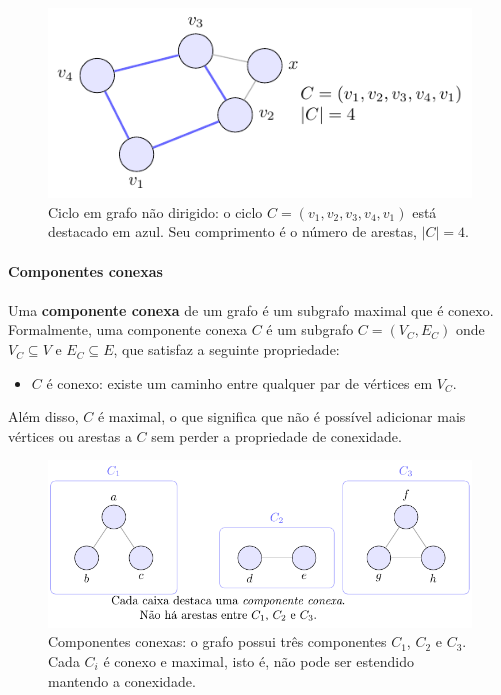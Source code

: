 \documentclass[12pt,a4paper]{article}
\def\emph#1{#1}%
\begin{document}
\begin{figure}[H]
    \centering
    \includegraphics[width=0.9\linewidth]{figures/fig_ciclo.pdf}

    \caption{Ciclo em grafo não dirigido: o ciclo $C=(v_1,v_2,v_3,v_4,v_1)$ está destacado em azul. Seu comprimento é o número de arestas, $|C|=4$.}
    \label{fig:ciclo}\end{figure}


\paragraph{Componentes conexas}
\paragraph{}Uma \textbf{componente conexa} de um grafo é um subgrafo maximal que é conexo. Formalmente, uma componente conexa \(C\) é um subgrafo \(C = (V_C, E_C)\) onde \(V_C \subseteq V\) e \(E_C \subseteq E\), que satisfaz a seguinte propriedade:
\begin{itemize}
    \item \(C\) é conexo: existe um caminho entre qualquer par de vértices em \(V_C\).
\end{itemize}
Além disso, \(C\) é maximal, o que significa que não é possível adicionar mais vértices ou arestas a \(C\) sem perder a propriedade de conexidade.


\begin{figure}[H]
    \centering
    \includegraphics[width=0.9\linewidth]{figures/fig_componentes.pdf}

    \caption{Componentes conexas: o grafo possui três componentes $C_1$, $C_2$ e $C_3$. Cada $C_i$ é conexo e \emph{maximal}, isto é, não pode ser estendido mantendo a conexidade.}
    \label{fig:componentes}
    \end{figure}
\end{document}
